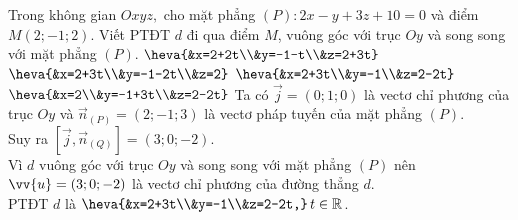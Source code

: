 \begin{ex}%
	Trong không gian $Oxyz,$ cho mặt phẳng $(P) \colon 2x-y+3z+10=0$ và điểm $M(2;-1;2)$. Viết PTĐT $d$ đi qua điểm $M$, vuông góc với trục $Oy$ và song song với mặt phẳng $(P)$.
	\choice
	{$\heva{&x=2+2t\\&y=-1-t\\&z=2+3t}$}
	{$\heva{&x=2+3t\\&y=-1-2t\\&z=2}$}
	{\True $\heva{&x=2+3t\\&y=-1\\&z=2-2t}$}
	{$\heva{&x=2\\&y=-1+3t\\&z=2-2t}$}
	\loigiai
	{
	Ta có $\vec{j}=(0;1;0)$ là vectơ chỉ phương của trục $Oy$ và $\vec{n}_{(P)}=(2;-1;3)$ là vectơ pháp tuyến của mặt phẳng $(P)$.\\
	Suy ra $\left[\vec{j},\vec{n}_{(Q)}\right]=(3;0;-2)$.\\
	Vì $d$ vuông góc với trục $Oy$ và song song với mặt phẳng $(P)$ nên $\vv{u}=(3;0;-2)$ là vectơ chỉ phương của đường thẳng $d$.\\
	PTĐT $d$ là $\heva{&x=2+3t\\&y=-1\\&z=2-2t,} \,t \in \mathbb{R}$.
	}
\end{ex}	
